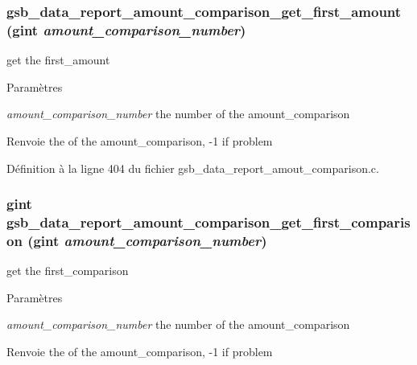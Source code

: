 \subsubsection[{gsb\_\-data\_\-report\_\-amount\_\-comparison\_\-get\_\-first\_\-amount}]{ gsb\_\-data\_\-report\_\-amount\_\-comparison\_\-get\_\-first\_\-amount (gint {\em amount\_\-comparison\_\-number})}\label{gsb__data__report__amout__comparison_8c_acf6a83475c566080242c5c6163abde54}
get the first\_\-amount


\begin{DoxyParams}{Paramètres}
\item[{\em amount\_\-comparison\_\-number}]the number of the amount\_\-comparison\end{DoxyParams}
\begin{DoxyReturn}{Renvoie}
the of the amount\_\-comparison, -\/1 if problem 
\end{DoxyReturn}


Définition à la ligne 404 du fichier gsb\_\-data\_\-report\_\-amout\_\-comparison.c.

\subsubsection[{gsb\_\-data\_\-report\_\-amount\_\-comparison\_\-get\_\-first\_\-comparison}]{\setlength{\rightskip}{0pt plus 5cm}gint gsb\_\-data\_\-report\_\-amount\_\-comparison\_\-get\_\-first\_\-comparison (gint {\em amount\_\-comparison\_\-number})}\label{gsb__data__report__amout__comparison_8c_a44f7f91f11a27716875d00423b81deea}
get the first\_\-comparison


\begin{DoxyParams}{Paramètres}
\item[{\em amount\_\-comparison\_\-number}]the number of the amount\_\-comparison\end{DoxyParams}
\begin{DoxyReturn}{Renvoie}
the of the amount\_\-comparison, -\/1 if problem 
\end{DoxyReturn}


